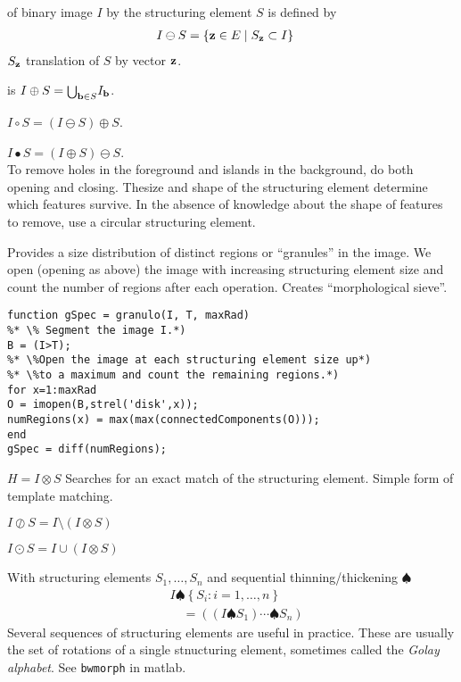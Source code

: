 \begin{compactdesc}
	\item[\lp{Erosion}] of binary image $I$ by the structuring element $S$ is defined by
		\begin{align*}
			I\ominus S&=\left\{ \bm{\mathrm{z}}\in E\mid S_{\bm{\mathrm{z}}}\subset I \right\}
		\end{align*}
			$S_{\bm{\mathrm{z}}}$ translation of $S$ by vector $\bm{\mathrm{z}}$.
	\item[\lp{Dilation}] is $I\oplus S={\scriptstyle\bigcup}_{\bm{\mathrm{b}}\in S}I_{\bm{\mathrm{b}}}$.
	\item[\lp{Opening}] $I\circ S=(I\ominus S)\oplus S$.
	\item[\lp{Closing}] $I\bullet S=(I\oplus S)\ominus S$.\\
		To remove holes in the foreground and islands in the background, do both opening and closing. Thesize and shape of the structuring element determine which features survive. In the absence of knowledge about the shape of features to remove, use a circular structuring element.
	\item[\lp{Granulometry}]
		Provides a size distribution of distinct regions or ``granules'' in the image. We open (opening as above) the image with increasing structuring element size and count the number of regions after each operation. Creates ``morphological sieve''.
		\begin{lstlisting}
function gSpec = granulo(I, T, maxRad)
%* \% Segment the image I.*)
B = (I>T);
%* \%Open the image at each structuring element size up*)
%* \%to a maximum and count the remaining regions.*)
for x=1:maxRad
O = imopen(B,strel('disk',x));
numRegions(x) = max(max(connectedComponents(O)));
end
gSpec = diff(numRegions);
		\end{lstlisting}
	\item[\lp{Hit-and-miss transform}] $H=I\otimes S$ Searches for an exact match of the structuring element. Simple form of template matching.
	\item[\lp{Thinning}] $I\oslash S=I\setminus (I\otimes S)$
	\item[\lp{Thickening}] $I\odot S=I\cup(I\otimes S)$
	\item[\lp{Sequential thinning/thickening}] With structuring elements $S_1,\ldots,S_n$ and sequential thinning/thickening $\spadesuit$
		\begin{align*}
			&I\spadesuit\left\{ S_i:i=1,\ldots,n \right\}\\
			&\quad=\left( \left(I\spadesuit S_1  \right) \cdots \spadesuit S_n \right)
		\end{align*}
		Several sequences of structuring elements are useful in practice. These are usually the set of rotations of a single stnucturing element, sometimes called the \emph{Golay alphabet}. See \lstinline{bwmorph} in matlab.
\end{compactdesc}
